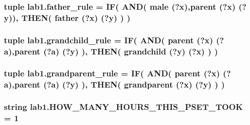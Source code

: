 \subsubsection[{father\+\_\+rule}]{\setlength{\rightskip}{0pt plus 5cm}tuple lab1.\+father\+\_\+rule = {\bf I\+F}( {\bf A\+N\+D}( \textquotesingle{}male (?x)\textquotesingle{},\textquotesingle{}parent (?x) (?y)\textquotesingle{}), {\bf T\+H\+E\+N}( \textquotesingle{}father (?x) (?y)\textquotesingle{} ) )}\label{namespacelab1_abc6ad6a1170b6579aaeb533235ca881a}
\hypertarget{namespacelab1_a9f7506c66c0a19593b0923d38db336e6}{}
\subsubsection[{grandchild\+\_\+rule}]{\setlength{\rightskip}{0pt plus 5cm}tuple lab1.\+grandchild\+\_\+rule = {\bf I\+F}( {\bf A\+N\+D}( \textquotesingle{}parent (?x) (?a)\textquotesingle{},\textquotesingle{}parent (?a) (?y)\textquotesingle{} ), {\bf T\+H\+E\+N}( \textquotesingle{}grandchild (?y) (?x)\textquotesingle{} ) )}\label{namespacelab1_a9f7506c66c0a19593b0923d38db336e6}
\hypertarget{namespacelab1_ab7ef57c55451e9eeceb1222753b433ee}{}
\subsubsection[{grandparent\+\_\+rule}]{\setlength{\rightskip}{0pt plus 5cm}tuple lab1.\+grandparent\+\_\+rule = {\bf I\+F}( {\bf A\+N\+D}( \textquotesingle{}parent (?x) (?a)\textquotesingle{},\textquotesingle{}parent (?a) (?y)\textquotesingle{} ), {\bf T\+H\+E\+N}( \textquotesingle{}grandparent (?x) (?y)\textquotesingle{} ) )}\label{namespacelab1_ab7ef57c55451e9eeceb1222753b433ee}
\hypertarget{namespacelab1_afe738a1054db3ebcdc4894cb30305608}{}
\subsubsection[{H\+O\+W\+\_\+\+M\+A\+N\+Y\+\_\+\+H\+O\+U\+R\+S\+\_\+\+T\+H\+I\+S\+\_\+\+P\+S\+E\+T\+\_\+\+T\+O\+O\+K}]{\setlength{\rightskip}{0pt plus 5cm}string lab1.\+H\+O\+W\+\_\+\+M\+A\+N\+Y\+\_\+\+H\+O\+U\+R\+S\+\_\+\+T\+H\+I\+S\+\_\+\+P\+S\+E\+T\+\_\+\+T\+O\+O\+K = \textquotesingle{}1\textquotesingle{}}\label{namespacelab1_afe738a1054db3ebcdc4894cb30305608}


